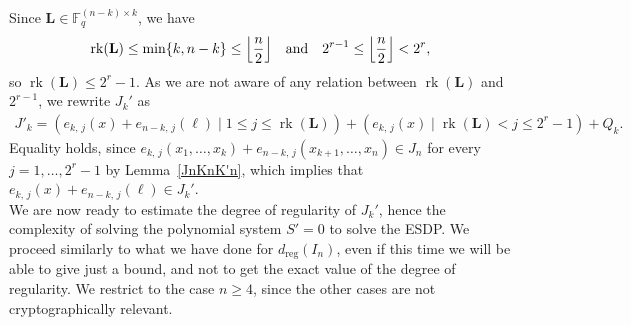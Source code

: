 \documentclass[11pt]{article}
\newcommand{\Fq}[0]{\mathbb{F}_q}
\newcommand{\es}[2]{e_{#1,\, #2}}
\DeclarePairedDelimiter{\fl}{\lfloor}{\rfloor}
\theoremstyle{plain}
\theoremstyle{definition}
\theoremstyle{remark}
\begin{document}
Since $\mathbf{L}\in\Fq^{(n-k)\times k}$, we have 
\begin{equation*}
    \operatorname{rk}(\mathbf{L})\leq\min\{k,n-k\}\leq\fl*{\frac{n}{2}}\quad\text{and}\quad{2^{r-1}\leq\fl*{\frac{n}{2}}}< 2^r,
\end{equation*}
so $\operatorname{rk}(\mathbf{L})\leq 2^r-1$. As we are not aware of any relation between $\operatorname{rk}(\mathbf{L})$ and $2^{r-1}$, we rewrite $J_k'$ as
\begin{align*}
    J'_k=(\es{k}{j}(x)+\es{n-k}{j}(\ell)\mid 1\leq j\leq\operatorname{rk}(\mathbf{L}))+(\es{k}{j}(x)\mid \operatorname{rk}(\mathbf{L})<j\leq 2^{r}-1)+Q_k.
\end{align*}
Equality holds, since $\es{k}{j}(x_1,\dots,x_k)+\es{n-k}{j}(x_{k+1},\dots,x_n)\in J_n$ for every $j=1,\dots,2^r-1$ by Lemma~\ref{JnKnK'n}, which implies that $\es{k}{j}(x)+\es{n-k}{j}(\ell)\in J_k'$.\\

We are now ready to estimate the degree of regularity of $J_k'$, hence the complexity of solving the polynomial system $S'=0$ to solve the ESDP. We proceed similarly to what we have done for $d_{\operatorname{reg}}(I_n)$, even if this time we will be able to give just a bound, and not to get the exact value of the degree of regularity. We restrict to the case $n\geq 4$, since the other cases are not cryptographically relevant.
\end{document}
